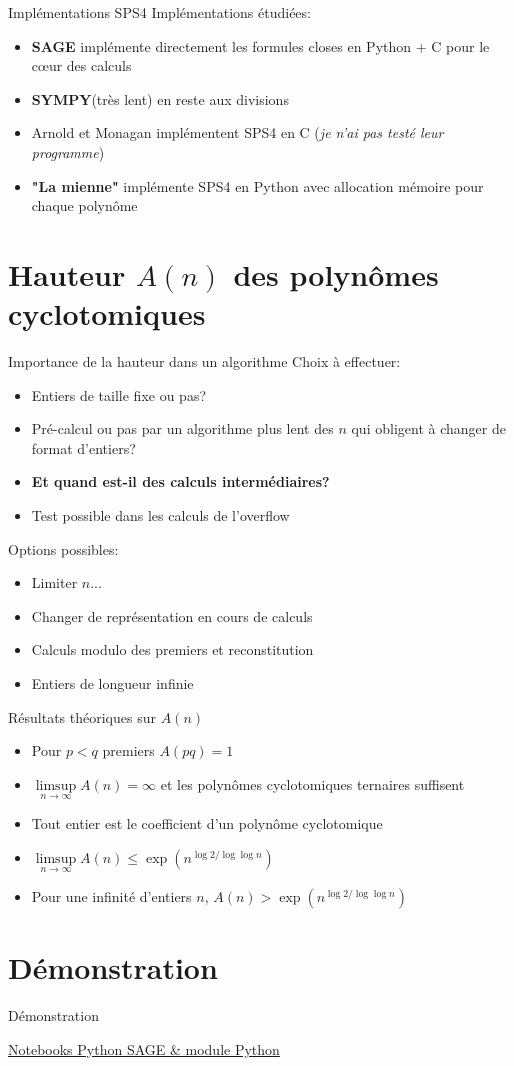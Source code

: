 \documentclass{beamer}
\begin{document}
	\begin{frame}{Implémentations SPS4}
		Implémentations étudiées:
		\begin{itemize}
			\item 
			\textbf{SAGE} implémente directement les formules closes en Python + C pour le cœur des calculs
			\item \textbf{SYMPY}(très lent) en reste aux divisions
			\item Arnold et Monagan implémentent SPS4 en C (\textit{je n'ai pas testé leur programme})
			\item \textbf{"La mienne"} implémente SPS4 en Python avec allocation mémoire pour chaque polynôme
		\end{itemize}
	\end{frame}

	\section{Hauteur $A(n)$ des polynômes cyclotomiques}
	
	\begin{frame}{Importance de la hauteur dans un algorithme}
		Choix à effectuer:
		\begin{itemize}
			\item Entiers de taille fixe ou pas?
			\item Pré-calcul ou pas par un algorithme plus lent des $n$ qui obligent à changer de format d'entiers?
			\item \textbf{Et quand est-il des calculs intermédiaires?}
			\item Test possible dans les calculs de l'overflow
		\end{itemize}
		Options possibles:
		\begin{itemize}
			\item Limiter $n$...
			\item Changer de représentation en cours de calculs
			\item Calculs modulo des premiers et reconstitution
			\item Entiers de longueur infinie
		\end{itemize}
	\end{frame}

	\begin{frame}{Résultats théoriques sur $A(n)$}
		\begin{itemize}
			\item Pour $p < q$ premiers $A(pq) = 1$
			\item $\limsup\limits_{n \to \infty} A(n) = \infty$ et les polynômes cyclotomiques ternaires suffisent
			\item Tout entier est le coefficient d'un polynôme cyclotomique
			\item $\limsup\limits_{n \to \infty} A(n) \le \exp(n^{\log 2 / \log \log n})$
			\item Pour une infinité d'entiers $n$, $A(n) > \exp(n^{\log 2 / \log \log n})$
		\end{itemize}		
	\end{frame}
		
	
	\section{Démonstration}
	\begin{frame}{Démonstration}
		
		\href{https://jupyter.math.sorbonne-universite.fr/user/21304439/lab}{Notebooks Python SAGE \& module Python}
		
	\end{frame}
	
\end{document}
